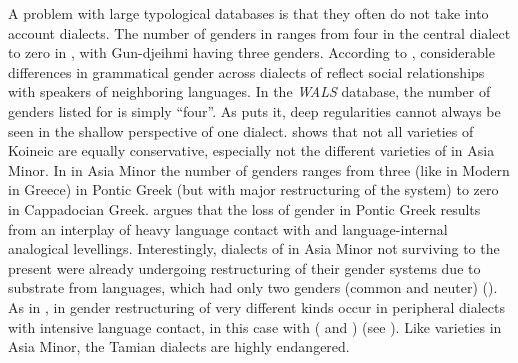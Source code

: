 \documentclass[output=collectionpaper]{langsci/langscibook}
\begin{document}
A problem with large typological databases is that they often do not take into account dialects. The number of genders in  ranges from four in the central  dialect to zero in , with Gun-djeihmi having three genders. According to \cite{Evans1997}, considerable differences in grammatical gender across dialects of  reflect social relationships with speakers of neighboring languages. In the \textit{WALS} database, the number of genders listed for  is simply ``four''. As \cite[105]{Evans1997} puts it, deep regularities cannot always be seen in the shallow perspective of one dialect. \cite{Karatsareas2014} shows that not all varieties of Koineic  are equally conservative, especially not the different varieties of  in Asia Minor. In  in Asia Minor the number of genders ranges from three (like in Modern  in Greece) in Pontic Greek (but with major restructuring of the system) to zero in Cappadocian Greek. \cite{Karatsareas2009} argues that the loss of gender in Pontic Greek results from an interplay of heavy language contact with  and language-internal analogical levellings. Interestingly, dialects of  in Asia Minor not surviving to the present were already undergoing restructuring of their gender systems due to substrate from  languages, which had only two genders (common and neuter) (\citealt[176]{Brixhe1994}). As in , in  gender restructuring of very different kinds occur in peripheral dialects with intensive language contact, in this case with  ( and ) (see \citealt{Waelchli2017}). Like  varieties in Asia Minor, the Tamian  dialects are highly endangered.
\end{document}
